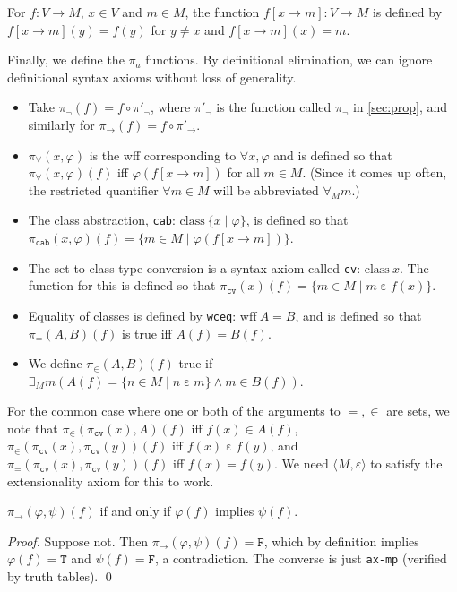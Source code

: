 \documentclass[runningheads,a4paper]{llncs}
\newcommand{\ang}[1]{\langle#1\rangle}
\newcommand{\vph}{\varphi}
\newcommand{\tT}{\texttt{T}}
\newcommand{\tF}{\texttt{F}}
\newcommand{\ep}{\mathbin{\varepsilon}}
\newcommand{\pt}[1]{\pi_\texttt{#1}}
\begin{document}
\begin{definition}
For $f:V\to M$, $x\in V$ and $m\in M$, the function $f[x\to m]:V\to M$ is defined by $f[x\to m](y)=f(y)$ for $y\ne x$ and $f[x\to m](x)=m$.
\end{definition}

Finally, we define the $\pi_a$ functions. By definitional elimination, we can ignore definitional syntax axioms without loss of generality.

\begin{itemize}
  \item Take $\pi_\lnot(f)=f\circ\pi'_\lnot$, where $\pi'_\lnot$ is the function called $\pi_\lnot$ in \autoref{sec:prop}, and similarly for $\pi_\to(f)=f\circ\pi'_\to$.
  \item $\pi_\forall(x,\vph)$ is the wff corresponding to $\forall x,\vph$ and is defined so that $\pi_\forall(x,\vph)(f)$ iff $\vph(f[x\to m])$ for all $m\in M$. (Since it comes up often, the restricted quantifier $\forall m\in M$ will be abbreviated $\forall_M m$.)
  \item The class abstraction, \texttt{cab}: $\mathrm{class}\ \{x\mid\vph\}$, is defined so that $\pt{cab}(x,\vph)(f)=\{m\in M\mid\vph(f[x\to m])\}$.
  \item The set-to-class type conversion is a syntax axiom called \texttt{cv}: $\mathrm{class}\ x$. The function for this is defined so that $\pt{cv}(x)(f)=\{m\in M\mid m\ep f(x)\}$.
  \item Equality of classes is defined by \texttt{wceq}: $\mathrm{wff}\ A=B$, and is defined so that $\pi_=(A,B)(f)$ is true iff $A(f)=B(f)$.
  \item We define $\pi_\in(A,B)(f)$ true if $\exists_M m(A(f)=\{n \in M\mid n\ep m\}\land m\in B(f))$.
\end{itemize}

For the common case where one or both of the arguments to $=,\in$ are sets, we note that $\pi_\in(\pt{cv}(x),A)(f)$ iff $f(x)\in A(f)$, $\pi_\in(\pt{cv}(x),\pt{cv}(y))(f)$ iff $f(x)\ep f(y)$, and $\pi_=(\pt{cv}(x),\pt{cv}(y))(f)$ iff $f(x)=f(y)$. We need $\ang{M,\ep}$ to satisfy the extensionality axiom for this to work.

\begin{lemma}\label{thm:ded}
$\pi_\to(\vph,\psi)(f)$ if and only if  $\vph(f)$ implies $\psi(f)$.
\end{lemma}
\begin{proof}
Suppose not. Then $\pi_\to(\vph,\psi)(f)=\tF$, which by definition implies $\vph(f)=\tT$ and $\psi(f)=\tF$, a contradiction. The converse is just \texttt{ax-mp} (verified by truth tables).
\qed\end{proof}
\end{document}
